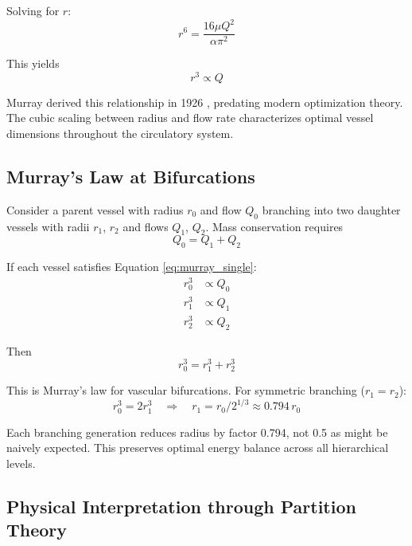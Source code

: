 \documentclass[10pt,twocolumn,a4paper]{article}
\theoremstyle{remark}
\begin{document}
Solving for $r$:
\begin{equation}
r^{6} = \frac{16\mu Q^{2}}{\alpha \pi^{2}}
\end{equation}

This yields
\begin{equation}
r^{3} \propto Q
\label{eq:murray_single}
\end{equation}

Murray derived this relationship in 1926 \cite{murray1926physiological}, predating modern optimization theory. The cubic scaling between radius and flow rate characterizes optimal vessel dimensions throughout the circulatory system.

\subsection{Murray's Law at Bifurcations}

Consider a parent vessel with radius $r_{0}$ and flow $Q_{0}$ branching into two daughter vessels with radii $r_{1}$, $r_{2}$ and flows $Q_{1}$, $Q_{2}$. Mass conservation requires
\begin{equation}
Q_{0} = Q_{1} + Q_{2}
\end{equation}

If each vessel satisfies Equation \ref{eq:murray_single}:
\begin{align}
r_{0}^{3} &\propto Q_{0} \\
r_{1}^{3} &\propto Q_{1} \\
r_{2}^{3} &\propto Q_{2}
\end{align}

Then
\begin{equation}
r_{0}^{3} = r_{1}^{3} + r_{2}^{3}
\label{eq:murray_bifurcation}
\end{equation}

This is Murray's law for vascular bifurcations. For symmetric branching ($r_{1} = r_{2}$):
\begin{equation}
r_{0}^{3} = 2r_{1}^{3} \quad \Rightarrow \quad r_{1} = r_{0}/2^{1/3} \approx 0.794 \, r_{0}
\end{equation}

Each branching generation reduces radius by factor 0.794, not 0.5 as might be naively expected. This preserves optimal energy balance across all hierarchical levels.

\subsection{Physical Interpretation through Partition Theory}
\end{document}
